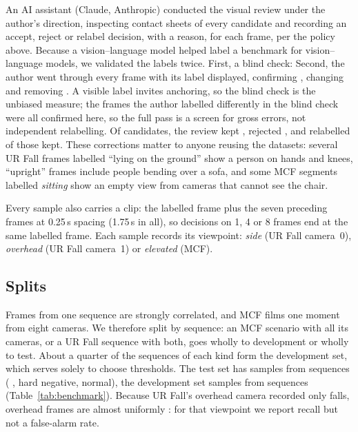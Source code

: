 An AI assistant (Claude, Anthropic) conducted the visual review under the author's direction, inspecting contact sheets of every candidate and recording an accept, reject or relabel decision, with a reason, for each frame, per the policy above. Because a vision--language model helped label a benchmark for vision--language models, we validated the labels twice. First, a blind check: \HumanCheckText{} Second, \iffullcheck the author went through every frame with its label displayed, confirming \FullConfirmed{}, changing \FullChanged{} and removing \FullRemoved{}. A visible label invites anchoring, so the blind check is the unbiased measure; the frames the author labelled differently in the blind check were all confirmed here, so the full pass is a screen for gross errors, not independent relabelling.\else{}\fi{} Of \BenchNCand{} candidates, the review kept \BenchNKept{}, rejected \BenchNRejected{}, and relabelled \BenchNRelabelled{} of those kept. These corrections matter to anyone reusing the datasets: several UR Fall frames labelled ``lying on the ground'' show a person on hands and knees, ``upright'' frames include people bending over a sofa, and some MCF segments labelled \textit{sitting} show an empty view from cameras that cannot see the chair.

Every sample also carries a clip: the labelled frame plus the seven preceding frames at 0.25\,s spacing (1.75\,s in all), so decisions on 1, 4 or 8 frames end at the same labelled frame. Each sample records its viewpoint: \textit{side} (UR Fall camera~0), \textit{overhead} (UR Fall camera~1) or \textit{elevated} (MCF).

\subsection{Splits}
Frames from one sequence are strongly correlated, and MCF films one moment from eight cameras. We therefore split by sequence: an MCF scenario with all its cameras, or a UR Fall sequence with both, goes wholly to development or wholly to test. About a quarter of the sequences of each kind form the development set, which serves solely to choose thresholds. The test set has \BenchNTest{} samples from \BenchNSeqTest{} sequences (\BenchTestDown{} \pd{}, \BenchTestHard{} hard negative, \BenchTestNormal{} normal), the development set \BenchNDev{} samples from \BenchNSeqDev{} sequences (Table~\ref{tab:benchmark}). Because UR Fall's overhead camera recorded only falls, overhead frames are almost uniformly \pd{}: for that viewpoint we report recall but not a false-alarm rate.

